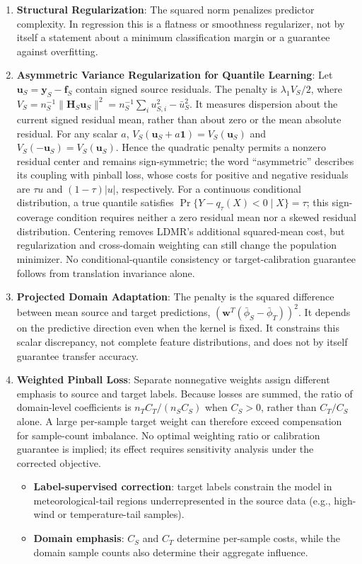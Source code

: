 \documentclass[a4paper]{cas-sc}
\begin{document}
\begin{enumerate}
    \item {\color{blue}\textbf{Structural Regularization}: The squared norm penalizes predictor complexity. In regression this is a flatness or smoothness regularizer, not by itself a statement about a minimum classification margin or a guarantee against overfitting.}
    \item {\color{blue}\textbf{Asymmetric Variance Regularization for Quantile Learning}: Let $\boldsymbol{u}_S=\boldsymbol{y}_S-\boldsymbol{f}_S$ contain signed source residuals. The penalty is $\lambda_1 V_S/2$, where $V_S=n_S^{-1}\|\boldsymbol{H}_S\boldsymbol{u}_S\|^2=n_S^{-1}\sum_i u_{S,i}^2-\bar u_S^2$. It measures dispersion about the current signed residual mean, rather than about zero or the mean absolute residual. For any scalar $a$, $V_S(\boldsymbol{u}_S+a\boldsymbol{1})=V_S(\boldsymbol{u}_S)$ and $V_S(-\boldsymbol{u}_S)=V_S(\boldsymbol{u}_S)$. Hence the quadratic penalty permits a nonzero residual center and remains sign-symmetric; the word ``asymmetric'' describes its coupling with pinball loss, whose costs for positive and negative residuals are $\tau u$ and $(1-\tau)|u|$, respectively. For a continuous conditional distribution, a true quantile satisfies $\Pr\{Y-q_\tau(X)<0\mid X\}=\tau$; this sign-coverage condition requires neither a zero residual mean nor a skewed residual distribution. Centering removes LDMR's additional squared-mean cost, but regularization and cross-domain weighting can still change the population minimizer. No conditional-quantile consistency or target-calibration guarantee follows from translation invariance alone.}
    \item {\color{blue}\textbf{Projected Domain Adaptation}: The penalty is the squared difference between mean source and target predictions, $(\boldsymbol{w}^T(\bar{\phi}_S-\bar{\phi}_T))^2$. It depends on the predictive direction even when the kernel is fixed. It constrains this scalar discrepancy, not complete feature distributions, and does not by itself guarantee transfer accuracy.}
    \item {\color{blue}\textbf{Weighted Pinball Loss}: Separate nonnegative weights assign different emphasis to source and target labels. Because losses are summed, the ratio of domain-level coefficients is $n_TC_T/(n_SC_S)$ when $C_S>0$, rather than $C_T/C_S$ alone. A large per-sample target weight can therefore exceed compensation for sample-count imbalance. No optimal weighting ratio or calibration guarantee is implied; its effect requires sensitivity analysis under the corrected objective.}
    \begin{itemize}
        \item \textbf{Label-supervised correction}: {\color{blue}target labels constrain the model in meteorological-tail regions underrepresented in the source data (e.g., high-wind or temperature-tail samples).}
        \item {\color{blue}\textbf{Domain emphasis}: $C_S$ and $C_T$ determine per-sample costs, while the domain sample counts also determine their aggregate influence.}
    \end{itemize}
\end{enumerate}
\end{document}
